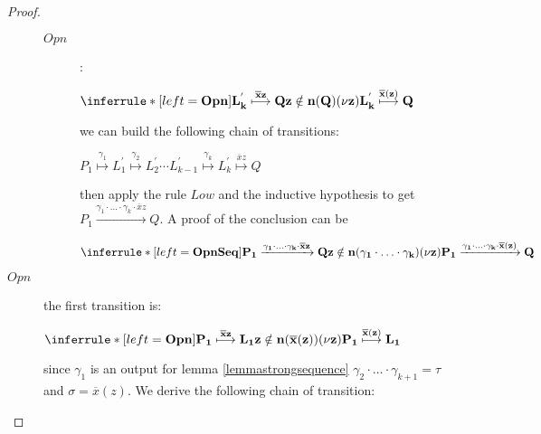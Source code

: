 \begin{proposition}
\begin{proof}
\begin{description}
\begin{description}
		  \item[$Opn$]:
		    \begin{center}
		      $$
		    \end{center}
		    we can build the following chain of transitions:
		    \begin{center}
		      $P_{1}  L_{1}^{'}  L_{2}^{'} \cdots L_{k-1}^{'}  L_{k}^{'} Q$ 
		    \end{center}
		    then apply the rule $Low$ and the inductive hypothesis to get $P_{1}  Q$. A proof of the conclusion can be
		    \begin{center}
		      $$
		    \end{center}
		\end{description}
	      \item[$Opn$] the first transition is:
		\begin{center}
		  $$ 
		\end{center}		
		since $\gamma_{1}$ is an output for lemma \ref{lemmastrongsequence} $\gamma_{2}\cdot \ldots \cdot \gamma_{k+1}=\tau$ and $\sigma=(z)$. We derive the following chain of transition:
		\begin{center}

\end{center}
\end{description}
\end{proof}
\end{proposition}
